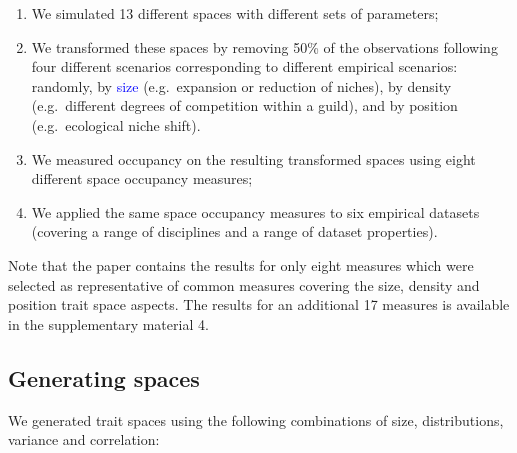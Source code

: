 \documentclass[]{article}
\providecommand{\tightlist}{%
  \setlength{\itemsep}{0pt}\setlength{\parskip}{0pt}}
\begin{document}
\begin{enumerate}
\def\labelenumi{\arabic{enumi}.}
\tightlist
\item
  We simulated 13 different spaces with different sets of parameters;
\item
  We transformed these spaces by removing 50\% of the observations
  following four different scenarios corresponding to different
  empirical scenarios: randomly, by
  \textcolor{blue}{size} (e.g.~expansion or reduction
  of niches), by density (e.g.~different degrees of competition within a
  guild), and by position (e.g.~ecological niche shift).
\item
  We measured occupancy on the resulting transformed spaces using eight
  different space occupancy measures;
\item
  We applied the same space occupancy measures to six empirical datasets
  (covering a range of disciplines and a range of dataset properties).
\end{enumerate}

Note that the paper contains the results for only eight measures which
were selected as representative of common measures covering the size,
density and position trait space aspects. The results for an additional
17 measures is available in the supplementary material 4.

\subsection{Generating spaces}\label{generating-spaces}

We generated trait spaces using the following combinations of size,
distributions, variance and correlation:

\renewcommand\baselinestretch{1}\selectfont
\end{document}
